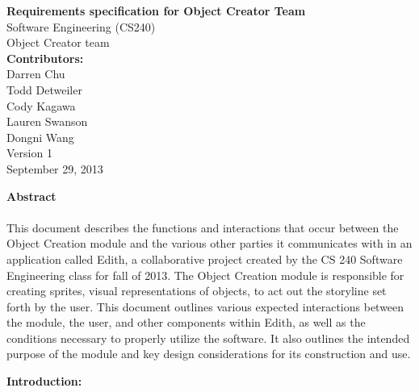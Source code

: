 \documentclass[12pt]{report}
\begin{document}
\begin{center}
{\bf\huge Requirements specification for Object Creator Team}
\\[3\baselineskip]
{\large Software Engineering (CS240)}
\\[2\baselineskip]
{\large Object Creator team}
\\[2\baselineskip]
{\bf Contributors: }\\
Darren Chu \\ Todd Detweiler \\ Cody Kagawa \\  Lauren Swanson \\  Dongni Wang 
\\[8\baselineskip]
Version 1\\
September 29, 2013 
\end{center} 
\pagebreak

\begin{center}
{\bf\large Abstract \\[1\baselineskip] }
\end{center}
{
\paragraph{\parindent 20pt}This document describes the functions and interactions that occur between the Object Creation module and the various other parties it communicates with in an application called Edith, a collaborative project created by the CS 240 Software Engineering class for fall of 2013. The Object Creation module is responsible for creating sprites, visual representations of objects, to act out the storyline set forth by the user. This document outlines various expected interactions between the module, the user, and other components within Edith, as well as the conditions necessary to properly utilize the software. It also outlines the intended purpose of the module and key design considerations for its construction and use.
}
\pagebreak

{\bf\large Introduction: \\[1\baselineskip] }

\pagebreak
\end{document}
